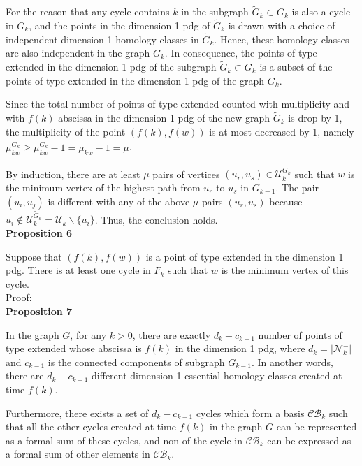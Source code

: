 \documentclass[a4paper,12pt]{article}
\numberwithin{equation}{section}
\begin{document}
	For the reason that any cycle contains $k$ in the subgraph $\tilde{G}_k \subset G_k$ is also a cycle in $G_k$, and the points in the dimension 1 pdg of $\tilde{G}_k$ is drawn with a choice of independent dimension 1 homology classes in $\tilde{G}_k$. Hence, these homology classes are also independent in the graph $G_k$. In consequence, the points of type extended in the dimension 1 pdg of the subgraph $\tilde{G}_k \subset G_k$ is a subset of the points of type extended in the dimension 1 pdg of the graph $G_k$.
	
	Since the total number of points of type extended counted with multiplicity and with $f(k)$ abscissa in the dimension 1 pdg of the new graph $\tilde{G}_k$ is drop by 1, the multiplicity of the point $(f(k),f(w))$ is at most decreased by 1, namely $\mu_{kw}^{\tilde{G}_k} \geq \mu_{kw}^{G_k} -1 = \mu_{kw} -1 = \mu$.
	
	By induction, there are at least $\mu$ pairs of vertices $(u_r, u_s) \in \mathcal{U}^{\tilde{G}_k}_k$ such that $w$ is the minimum vertex of the highest path from $u_r$ to $u_s$ in $G_{k-1}$. The pair $(u_i,u_j)$ is different with any of the above $\mu$ pairs $(u_r,u_s)$ because $u_i \notin \mathcal{U}^{\tilde{G}_k}_k = \mathcal{U}_k \backslash \{u_i\}$. Thus, the conclusion holds.\\


	\noindent \textbf{Proposition 6}
	
	Suppose that $(f(k), f(w))$ is a point of type extended in the dimension 1 pdg. There is at least one cycle in $F_k$ such that $w$ is the minimum vertex of this cycle.\\
	
	\noindent Proof:\\
	
	\noindent \textbf{Proposition 7}
	
	In the graph $G$, for any $k>0$, there are exactly $d_k - c_{k-1}$ number of points of type extended whose abscissa is $f(k)$ in the dimension 1 pdg, where $d_k = \vert \mathcal{N}^-_{k} \vert$ and $c_{k-1}$ is the connected components of subgraph $G_{k-1}$. In another words, there are $d_k - c_{k-1}$ different dimension 1 essential homology classes created at time $f(k)$.
	
	Furthermore, there exists a set of $d_k - c_{k-1}$ cycles which form a basis $\mathcal{CB}_k$ such that all the other cycles created at time $f(k)$ in the graph $G$ can be represented as a formal sum of these cycles, and non of the cycle in $\mathcal{CB}_k$ can be expressed as a formal sum of other elements in $\mathcal{CB}_k$.\\
	
\end{document}
